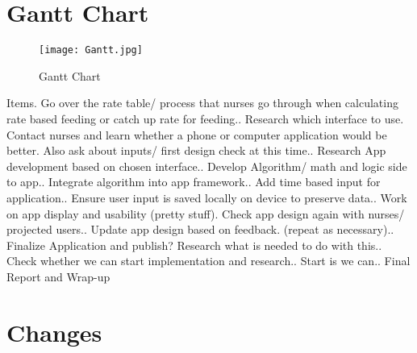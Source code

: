 \documentclass[fullpage,10pt, onecolumn, draftclsnofoot]{IEEEtran}
\begin{document}
\section{Gantt Chart}
\begin{figure}[h!]
\centering
\texttt{[image: Gantt.jpg]}
\centering
\caption{Gantt Chart}
\label{fig:gantt_chartl}
\end{figure}
Items. Go over the rate table/ process that nurses go through when calculating rate based feeding or catch up rate for feeding.. Research which interface to use. Contact nurses and learn whether a phone or computer application would be better. Also ask about inputs/ first design check at this time.. Research App development based on chosen interface.. Develop Algorithm/ math and logic side to app.. Integrate algorithm into app framework.. Add time based input for application.. Ensure user input is saved locally on device to preserve data.. Work on app display and usability (pretty stuff). Check app design again with nurses/ projected users.. Update app design based on feedback. (repeat as necessary).. Finalize Application and publish? Research what is needed to do with this.. Check whether we can start implementation and research.. Start is we can.. Final Report and Wrap-up\newline

\section{Changes}
\end{document}
